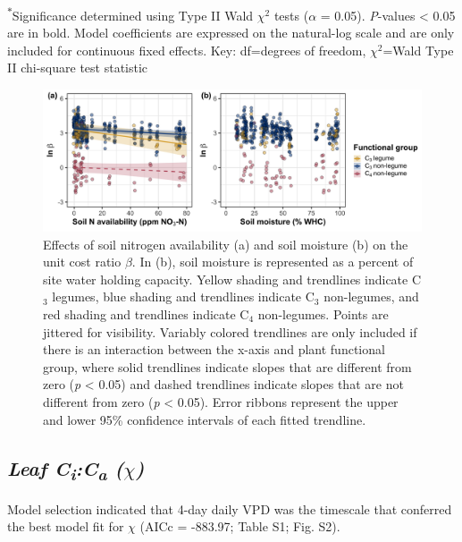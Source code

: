 \noindent \textsuperscript{$*$}Significance determined using Type II Wald $\chi^{2}$ tests ($\alpha$ = 0.05). \textit{P}-values < 0.05 are in bold. Model coefficients are expressed on the natural-log scale and are only included for continuous fixed effects. Key: df=degrees of freedom, $\chi^2$=Wald Type II chi-square test statistic
\clearpage

\newpage
\begin{landscape}
    \begin{figure}
    \centering
    \includegraphics[scale = 0.075]{ch4_TXeco/figs/TXeco_fig2_beta.png}
    \caption[Effects of soil nitrogen availability and soil moisture on the unit cost ratio $\beta$]{Effects of soil nitrogen availability (a) and soil moisture (b) on the unit cost ratio $\beta$. In (b), soil moisture is represented as a percent of site water holding capacity. Yellow shading and trendlines indicate C$_3$ legumes, blue shading and trendlines indicate C$_3$ non-legumes, and red shading and trendlines indicate C$_4$ non-legumes. Points are jittered for visibility. Variably colored trendlines are only included if there is an interaction between the x-axis and plant functional group, where solid trendlines indicate slopes that are different from zero (\textit{p} < 0.05) and dashed trendlines indicate slopes that are not different from zero (\textit{p} < 0.05). Error ribbons represent the upper and lower 95\% confidence intervals of each fitted trendline.}
    \label{fig:figure4.2}
\end{figure}
\end{landscape}
\clearpage

\subsection{\textit{Leaf C\textsubscript{i}:C\textsubscript{a} ($\chi$)}}
Model selection indicated that 4-day daily VPD was the timescale that conferred the best model fit for $\chi$ (AICc = -883.97; Table S1; Fig. S2).

